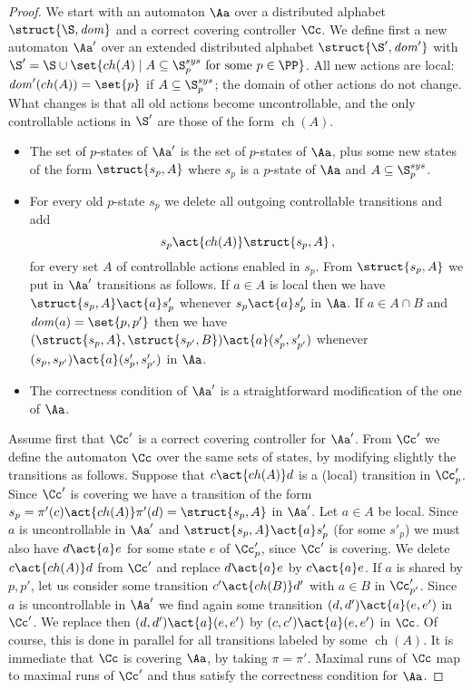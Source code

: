 \documentclass[10pt,a4paper]{article}
\newcommand{\loc}{\mathit{dom}}
\newcommand{\Ssys}{\S^{sys}}
\newcommand{\ch}{\mathop{ch}}
\begin{document}
\begin{proof}
  We start with an automaton $\Aa$ over a distributed alphabet
  $\struct{\S,\loc}$ and a correct covering controller $\Cc$.  We
  define first a new automaton $\Aa'$ over an extended distributed
  alphabet $\struct{\S',\loc'}$ with $\S'=\S \cup \set{\ch(A) \mid A
    \subseteq \Ssys_p \text{ for some } p \in \PP}$. All new actions
  are local: $\loc'(\ch(A))=\set{p}$ if $A \subseteq \Ssys_p$; the
  domain of other actions do not change. What changes is that all old
  actions become uncontrollable, and the only controllable actions in
  $\S'$ are those of the form $\ch(A)$.

  \begin{itemize}
  \item The set of $p$-states of $\Aa'$ is the set of $p$-states of $\Aa$,
    plus some new states of the form $\struct{s_p,A}$ where $s_p$ is a
    $p$-state of $\Aa$ and $A \subseteq \Ssys_p$. 
\item For every old $p$-state $s_p$ we delete all outgoing
  controllable transitions and add
  \[s_p \act{\ch(A)} \struct{s_p,A}\,,\] for every set $A$ of
  controllable actions enabled in $s_p$. From $\struct{s_p,A}$ we put in $\Aa'$ 
  transitions as follows. If $a \in A$ is local then we
  have $\struct{s_p,A} \act{a} s'_p$ whenever
  $s_p \act{a} s'_p$ in $\Aa$. If $a \in A \cap B$ and
  $\loc(a)=\set{p,p'}$ then we have $(\struct{s_p,A},\struct{s_{p'},B})
  \act{a} (s'_p,s'_{p'})$ whenever $(s_p,s_{p'}) \act{a}
  (s'_p,s'_{p'})$ in $\Aa$.
\item The correctness condition of $\Aa'$ is a straightforward
  modification of the one of $\Aa$. 

\end{itemize}

  Assume first that $\Cc'$ is a correct covering controller for
  $\Aa'$. From $\Cc'$ we define the automaton $\Cc$ over the same sets
  of states, by modifying slightly the transitions as follows. Suppose
  that $c \act{\ch(A)} d$ is a (local) transition in $\Cc'_p$. Since
  $\Cc'$ is covering we have a transition of the form $s_p=\pi'(c)
  \act{\ch(A)} \pi'(d)=\struct{s_p,A}$ in $\Aa'$. Let $a \in A$ be
  local. Since $a$ is uncontrollable in $\Aa'$ and $\struct{s_p,A}
  \act{a} s'_p$ (for some $s'_p$) we must also have $d \act{a} e$ for
  some state $e$ of $\Cc'_p$, since $\Cc'$ is covering. We delete $c
  \act{\ch(A)} d$ from $\Cc'$ and replace $d \act{a} e$ by $c \act{a}
  e$. If $a$ is shared by $p,p'$, let us consider some transition $c'
  \act{\ch(B)} d'$ with $a \in B$ in $\Cc'_{p'}$. Since $a$ is
  uncontrollable in $\Aa'$ we find again some transition
  $(d,d')\act{a} (e,e')$ in $\Cc'$. We replace then $(d,d')\act{a}
  (e,e')$ by $(c,c') \act{a} (e,e')$ in $\Cc$. Of course, this is done
  in parallel for all transitions labeled by some $\ch(A)$. It is
  immediate that $\Cc$ is covering $\Aa$, by taking
  $\pi=\pi'$. Maximal runs of $\Cc$ map to maximal runs of $\Cc'$ and
  thus satisfy the correctness condition for $\Aa$.


\end{proof}
\end{document}
